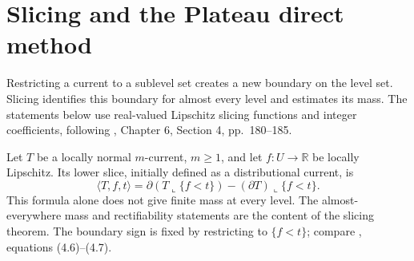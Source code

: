 \chapter{Slicing and the Plateau direct method}\label{sec:current-slicing}
Restricting a current to a sublevel set creates a new boundary on the level set. Slicing identifies this boundary for almost every level and estimates its mass. The statements below use real-valued Lipschitz slicing functions and integer coefficients, following \cite{Sim18}, Chapter 6, Section 4, pp.~180--185.

\begin{definition}\label{def:current-slice}
Let $T$ be a locally normal $m$-current, $m\geq1$, and let $f:U\to\mathbb R$ be locally Lipschitz. Its lower slice, initially defined as a distributional current, is
\[
 \langle T,f,t\rangle
 =\partial(T\llcorner\{f<t\})-(\partial T)\llcorner\{f<t\}.
\]
This formula alone does not give finite mass at every level. The almost-everywhere mass and rectifiability statements are the content of the slicing theorem. The boundary sign is fixed by restricting to $\{f<t\}$; compare \cite{Sim18}, equations (4.6)--(4.7).
\end{definition}

